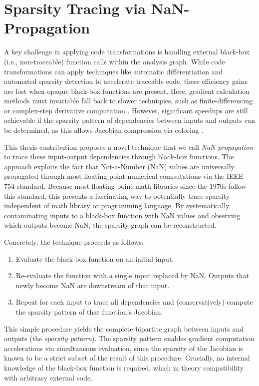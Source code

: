 \chapter{Sparsity Tracing via NaN-Propagation}
\label{sec:nan_propagation}

A key challenge in applying code transformations is handling external black-box (i.e., non-traceable) function calls within the analysis graph. While code transformations can apply techniques like automatic differentiation and automated sparsity detection to accelerate traceable code, these efficiency gains are lost when opaque black-box functions are present. Here, gradient calculation methods must invariable fall back to slower techniques, such as finite-differencing or complex-step derivative computation \cite{martins_complexstep_2003}. However, significant speedups are still achievable if the sparsity pattern of dependencies between inputs and outputs can be determined, as this allows Jacobian compression via coloring \cite{gebremedhin_efficient_2009, gebremedhin_what_2005}.

This thesis contribution proposes a novel technique that we call \textit{NaN propagation} to trace these input-output dependencies through black-box functions. The approach exploits the fact that Not-a-Number (NaN) values are universally propagated through most floating-point numerical computations via the IEEE 754 standard. Because most floating-point math libraries since the 1970s follow this standard, this presents a fascinating way to potentially trace sparsity independent of math library or programming language. By systematically contaminating inputs to a black-box function with NaN values and observing which outputs become NaN, the sparsity graph can be reconstructed.

Concretely, the technique proceeds as follows:

\begin{enumerate}
    \item Evaluate the black-box function on an initial input.
    \item Re-evaluate the function with a single input replaced by NaN. Outputs that newly become NaN are downstream of that input.
    \item Repeat for each input to trace all dependencies and (conservatively) compute the sparsity pattern of that function's Jacobian.
\end{enumerate}
This simple procedure yields the complete bipartite graph between inputs and outputs (the \textit{sparsity pattern}). The sparsity pattern enables gradient computation accelerations via simultaneous evaluation, since the sparsity of the Jacobian is known to be a strict subset of the result of this procedure. Crucially, no internal knowledge of the black-box function is required, which in theory compatibility with arbitrary external code.

